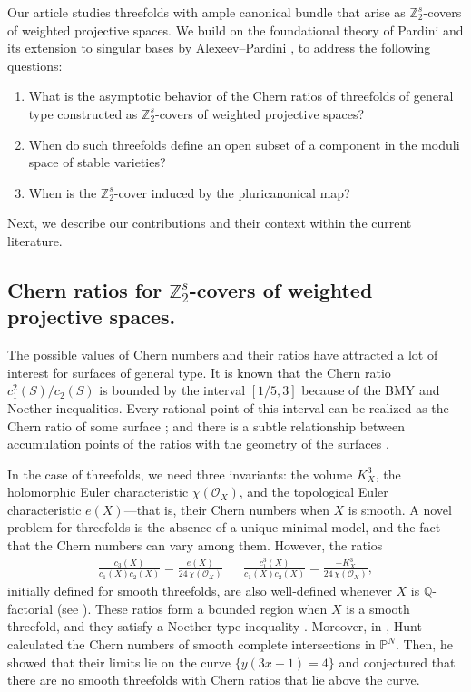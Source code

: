 \documentclass[12pt,twoside,]{amsart}
\theoremstyle{plain}
\theoremstyle{definition}
\begin{document}
Our article studies threefolds with ample canonical bundle that arise as  \(\mathbb{Z}_2^{s}\)-covers of weighted projective spaces.  We build on the foundational theory of Pardini \cite{pardini1991abelian} and its extension to singular bases by Alexeev–Pardini \cite{AP12}, to address the following questions:
\begin{enumerate}
    \item[(i)] What is the asymptotic behavior of the Chern ratios of threefolds of general type constructed as \(\mathbb{Z}_2^{s}\)-covers of weighted projective spaces?
    \item[(ii)] When do such threefolds define an open subset of a component in the moduli space of stable varieties?
    \item[(iii)] When is the \(\mathbb{Z}_2^{s}\)-cover induced by the pluricanonical map?
\end{enumerate}
Next, we describe our contributions and their context within the current literature. 

\subsection{Chern ratios for \(\mathbb{Z}_2^{s}\)-covers of weighted projective spaces.}
The possible values of Chern numbers and their ratios have attracted a lot of interest for surfaces of general type. It is known that the Chern ratio \( c_1^2(S)/c_2(S) \) is bounded by the interval \([1/5,3] \) because of the BMY and Noether inequalities. Every rational point of this interval can be realized as the Chern ratio of some surface \cite{sommese1984density};
and there is a subtle
relationship between accumulation points of the ratios with  the geometry of the surfaces \cite{roulleau2015chern}.

In the case of threefolds, we need three invariants: the volume \(K_X^3\), the holomorphic Euler characteristic \(\chi(\mathcal{O}_X)\), and the topological Euler characteristic \(e(X)\)—that is, their Chern numbers when \(X\) is smooth. A novel problem for threefolds is the absence of a unique minimal model, and the fact that the Chern numbers can vary among them. However, the ratios
\begin{align*}
\frac{c_3(X)}{c_1(X)c_2(X)}
=
\frac{e(X)}{24\,\chi(\mathcal{O}_X)}
&&
\frac{c_1^3(X)}{c_1(X)c_2(X)}
=
\frac{-K_X^3}{24\,\chi(\mathcal{O}_X)},
\end{align*}
initially defined for smooth threefolds, 
are also well-defined whenever \(X\) is \(\mathbb{Q}\)-factorial (see \cite{huntthreefolds89}). These ratios form a bounded region \cite{changlopez01} when $X$ is a smooth threefold, and they satisfy a Noether-type inequality \cite{chenchenjiang20, chenhujiang25}. Moreover, in \cite[Sec 7.2.3-7.2.4]{huntthreefolds89}, Hunt calculated the Chern numbers of smooth complete intersections in $\mathbb{P}^N$. Then, he showed that their limits lie on the curve 
 $\{ y(3x+1) = 4\}$ and conjectured that there are no smooth threefolds with Chern ratios that lie above the curve. 
 
\end{document}
